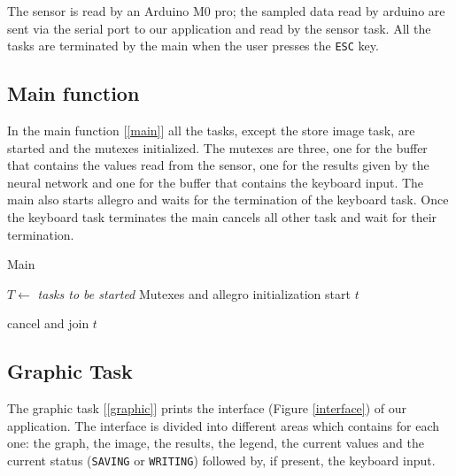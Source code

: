\documentclass[12pt]{article}
\begin{document}
The sensor is read by an Arduino M0 pro; the sampled data read by arduino
are sent via the serial port to our application and read by the sensor
task. All the tasks are terminated by the main when the user presses the
\texttt{ESC} key.

\subsection{Main function}
In the main function [\ref{main}] all the tasks, except the store image task,
are started and the mutexes initialized. The mutexes are three, one for the
buffer that contains the values read from the sensor, one for the results
given by the neural network and one for the buffer that contains the keyboard
input. The main also starts allegro and waits for the termination of the
keyboard task. Once the keyboard task terminates the main cancels all other
task and wait for their termination.

\begin{algorithm}[b]
\caption{Main}
\label{main}

\begin{algorithmic}
\State $T\gets$ \textit{tasks to be started}
\State Mutexes and allegro initialization
    \State start $t$
\EndFor

\Repeat
{}

    \State cancel and join $t$
\EndFor

\end{algorithmic}
\end{algorithm}

\subsection{Graphic Task}

The graphic task [\ref{graphic}] prints the interface (Figure
\ref{interface}) of our application. The interface is divided into different
areas which contains for each one: the graph, the image, the results, the
legend, the current values and the current status (\texttt{SAVING} or
\texttt{WRITING}) followed by, if present, the keyboard input.
\end{document}
